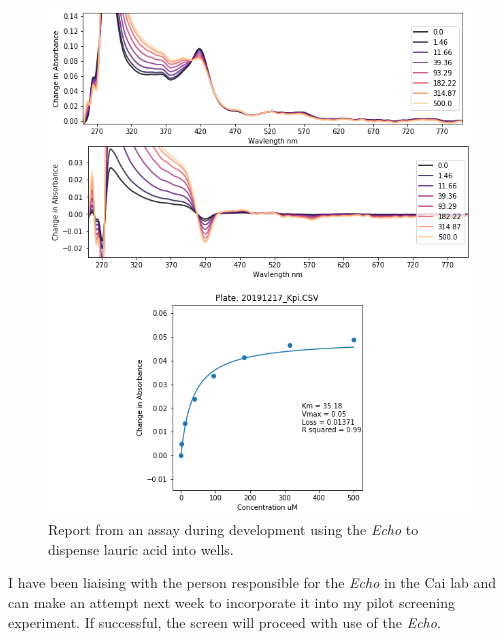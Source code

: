 \documentclass{article}
\begin{document}
\begin{figure}
	\includegraphics[width = \textwidth]{echo-report.png} 
	\caption{Report from an assay during development using the \textit{Echo} to dispense lauric acid into wells. \label{echo_report}}
\end{figure}

\par
I have been liaising with the person responsible for the \textit{Echo} in the Cai lab and can make an attempt next week to incorporate it into my pilot screening experiment. If successful, the screen will proceed with use of the \textit{Echo}. %
\pagebreak
\end{document}
